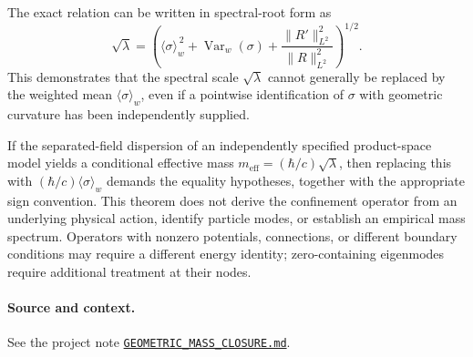 \documentclass[11pt]{article}
\newcommand{\avg}[1]{\langle #1\rangle_w}
\newcommand{\Var}{\operatorname{Var}}
\begin{document}
The exact relation can be written in spectral-root form as
\begin{equation}\label{eq:rootidentity}
    \boxed{
    \sqrt{\lambda}=
    \left(
      \avg{\sigma}^{\,2}
      +\Var_w(\sigma)
      +\frac{\|R'\|_{L^2}^2}{\|R\|_{L^2}^2}
    \right)^{1/2}.}
\end{equation}
This demonstrates that the spectral scale $\sqrt{\lambda}$
cannot generally be replaced by the weighted mean $\avg{\sigma}$,
even if a pointwise identification of $\sigma$ with geometric
curvature has been independently supplied.

If the separated-field dispersion of an independently specified
product-space model yields a conditional effective mass
$m_{\mathrm{eff}}=(\hbar/c)\sqrt{\lambda}$, then replacing this with
$(\hbar/c)\avg{\sigma}$ demands the equality hypotheses, together
with the appropriate sign convention.  This theorem does not derive
the confinement operator from an underlying physical action, identify
particle modes, or establish an empirical mass spectrum.  Operators
with nonzero potentials, connections, or different boundary conditions
may require a different energy identity; zero-containing eigenmodes
require additional treatment at their nodes.

\paragraph{Source and context.}
See the project note
\href{https://github.com/rickyjreyes/geometry_of_resonance/blob/main/docs/foundational/GEOMETRIC_MASS_CLOSURE.md}
{\texttt{GEOMETRIC\_MASS\_CLOSURE.md}}.
\end{document}
